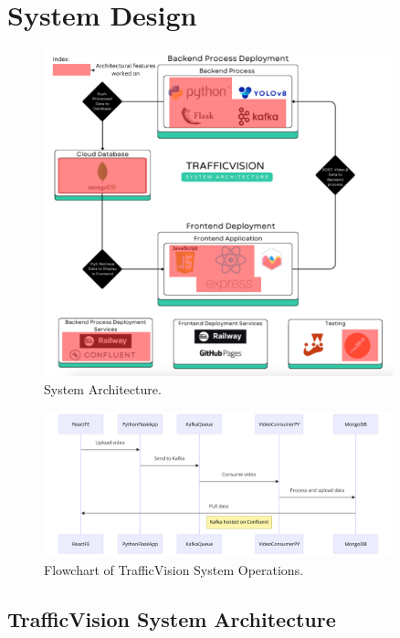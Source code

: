 \chapter{System Design}

\begin{figure}[H]
    \centering
    \includegraphics[width=0.9\textwidth]{images/architecture.png}
    \caption{System Architecture.}
    \label{image:sysArchitecture}
\end{figure}

\begin{figure}[H]
    \centering
    \includegraphics[width=0.9\textwidth]{images/systemFlowChart.png}
    \caption{Flowchart\cite{lucidchartDataFlow} of TrafficVision System Operations.}
    \label{fig:systemFlowChart}
\end{figure}


\section{TrafficVision System Architecture}

